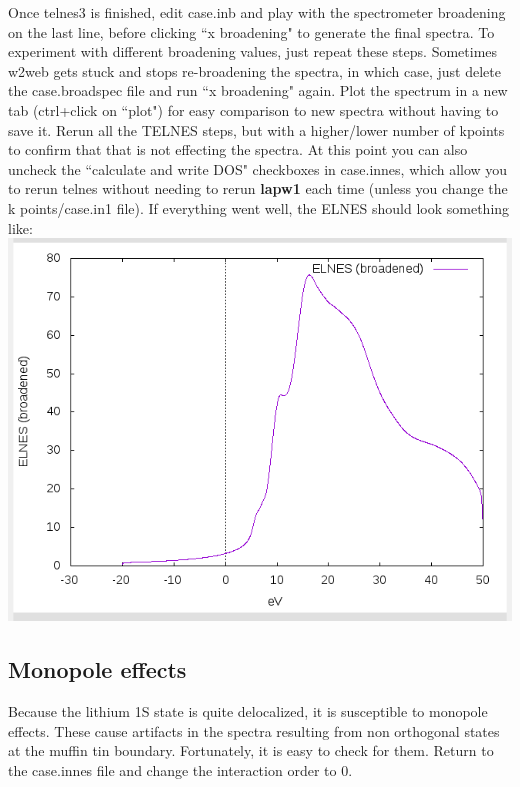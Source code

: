 \documentclass[12pt]{article}
\begin{document}
Once telnes3 is finished, edit case.inb and play with the spectrometer broadening on the last line, before clicking ``x broadening" to generate the final spectra. To experiment with different broadening values, just repeat these steps.  Sometimes w2web gets stuck and stops re-broadening the spectra, in which case, just delete the case.broadspec file and run ``x broadening" again.   Plot the spectrum in a new tab (ctrl+click on ``plot") for easy comparison to new spectra without having to save it. Rerun all the TELNES steps, but with a higher/lower number of kpoints to confirm that that is not effecting the spectra. At this point you can also uncheck the ``calculate and write DOS" checkboxes in case.innes, which allow you to rerun telnes without needing to rerun\textbf{ lapw1} each time (unless you change the k points/case.in1 file).  If everything went well, the ELNES should look something like:   \\

\includegraphics[scale=0.4]{./images/no_hole_elnes.png}

\subsection{Monopole effects}
Because the lithium 1S state is quite delocalized, it is susceptible to monopole effects.  These cause artifacts in the spectra resulting from non orthogonal states at the muffin tin boundary.  Fortunately, it is easy to check for them.  Return to the case.innes file and change the interaction order to 0. \\
\end{document}

